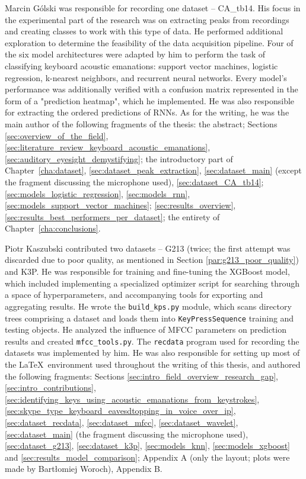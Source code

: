 \documentclass[../main.tex]{subfiles}
\begin{document}
Marcin Gólski was responsible for recording one dataset -- CA\_tb14.
His focus in the experimental part of the research was on extracting peaks from recordings and creating classes to
work with this type of data.
He performed additional exploration to determine the feasibility of the data acquisition pipeline.
Four of the six model architectures were adapted by him to perform the task of classifying keyboard acoustic emanations:
support vector machines, logistic regression, k-nearest neighbors, and recurrent neural networks. 
Every model's performance was additionally verified with a confusion matrix represented in the form of a "prediction heatmap", which he implemented. He was also responsible for extracting the ordered predictions of RNNs.
As for the writing, he was the main author of the following fragments of the thesis: the abstract; Sections
\ref{sec:overview_of_the_field}, \ref{sec:literature_review_keyboard_acoustic_emanations}, \ref{sec:auditory_eyesight_demystifying}; 
the introductory part of Chapter~\ref{cha:dataset}, \ref{sec:dataset_peak_extraction}, \ref{sec:dataset_main} (except the fragment discussing the microphone used), \ref{sec:dataset_CA_tb14};
\ref{sec:models_logistic_regression}, \ref{sec:models_rnn}, \ref{sec:models_support_vector_machines};
\ref{sec:results_overview}, \ref{sec:results_best_performers_per_dataset};
the entirety of Chapter~\ref{cha:conclusions}.

Piotr Kaszubski contributed two datasets -- G213 (twice; the first attempt was discarded due
to poor quality, as mentioned in Section \ref{par:g213_poor_quality}) and K3P.
He was responsible for training and fine-tuning the XGBoost
model, which included implementing a specialized optimizer script for searching through
a space of hyperparameters, and accompanying tools for exporting and aggregating results.
He wrote the \verb`build_kps.py` module, which scans directory trees comprising a dataset
and loads them into \verb`KeyPressSequence` training and testing objects.
He analyzed the influence of MFCC parameters on prediction results and created
\verb`mfcc_tools.py`. The \verb`recdata` program used for recording the datasets was
implemented by him. He was also responsible for setting up most of the \LaTeX~environment
used throughout the writing of this thesis, and authored the following fragments:
Sections
\ref{sec:intro_field_overview_research_gap},
\ref{sec:intro_contributions},
\ref{sec:identifying_keys_using_acoustic_emanations_from_keystrokes},
\ref{sec:skype_type_keyboard_eavesdtopping_in_voice_over_ip},
\ref{sec:dataset_recdata},
\ref{sec:dataset_mfcc},
\ref{sec:dataset_wavelet},
\ref{sec:dataset_main} (the fragment discussing the microphone used),
\ref{sec:dataset_g213},
\ref{sec:dataset_k3p},
\ref{sec:models_knn},
\ref{sec:models_xgboost} and
\ref{sec:results_model_comparison};
Appendix A (only the layout; plots were made by Bartłomiej Woroch),
Appendix B.
\end{document}
